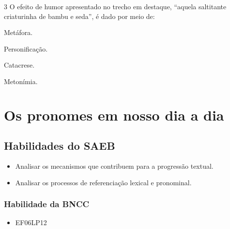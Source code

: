 \num{3} O efeito de humor apresentado no trecho em destaque, ``aquela saltitante
criaturinha de bambu e seda'', é dado por meio de:

\begin{escolha}
\item Metáfora.
\item Personificação.
\item Catacrese.
\item Metonímia.
\end{escolha}




\chapter{Os pronomes em nosso dia a dia}

\section*{Habilidades do SAEB }
\begin{itemize}
\item Analisar os mecanismos que contribuem para a
progressão textual. 
\item Analisar os processos de referenciação lexical e
pronominal.
\end{itemize}

\subsection*{Habilidade da BNCC}
\begin{itemize}
\item EF06LP12
\end{itemize}

